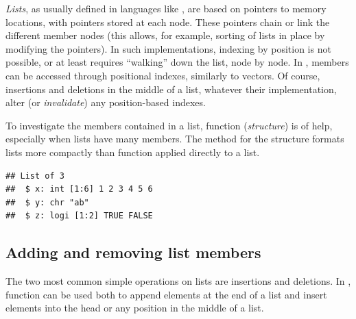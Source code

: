 \documentclass[krantz2]{krantz}\usepackage{knitr}
\begin{document}
\begin{explainbox}
\emph{Lists}, as usually defined in languages like \Clang, are based on pointers to memory locations, with pointers stored at each node. These pointers chain or link the different member nodes (this allows, for example, sorting of lists in place by modifying the pointers). In such implementations, indexing by position is not possible, or at least requires ``walking'' down the list, node by node. In \Rlang,  members can be accessed through positional indexes, similarly to vectors. Of course, insertions and deletions in the middle of a list, whatever their implementation, alter (or \emph{invalidate}) any position-based indexes.
\end{explainbox}

To investigate the members contained in a list, function  (\emph{structure}) is of help, especially when lists have many members. The  method for the structure formats lists more compactly than function  applied directly to a list.\label{par:calc:str}

\begin{knitrout}\footnotesize
{}\color{fgcolor}\begin{kframe}
\begin{alltt}
\end{alltt}
\begin{verbatim}
## List of 3
##  $ x: int [1:6] 1 2 3 4 5 6
##  $ y: chr "ab"
##  $ z: logi [1:2] TRUE FALSE
\end{verbatim}
\end{kframe}
\end{knitrout}


\subsection{Adding and removing list members}
The two most common simple operations on lists are insertions and deletions. In \Rlang, function  can be used both to append elements at the end of a list and insert elements into the head or any position in the middle of a list.
\end{document}
